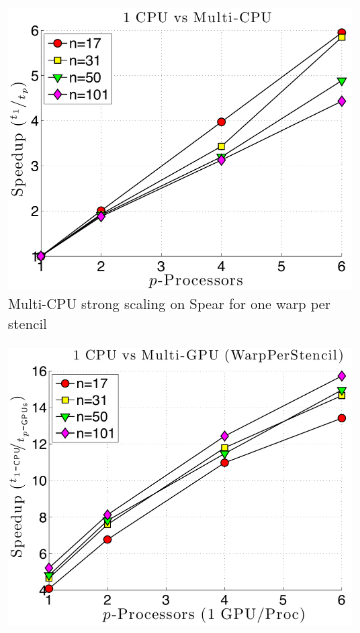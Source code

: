 \begin{figure}
\centering
\begin{subfigure}[t]{0.425\textwidth}
\centering
\includegraphics[width=1.0\textwidth]{../figures/spear_results/alltoallv_vortex/speedup_1CPU_vs_NCPU.pdf}
\caption{Multi-CPU strong scaling on Spear for one warp per stencil}
\label{fig:spear_alltoall_multicpu_scaling}
\end{subfigure} 
\begin{subfigure}[t]{0.425\textwidth}
\centering
\includegraphics[width=1.0\textwidth]{../figures/spear_results/alltoallv_vortex/speedup_1CPU_vs_NGPU_WarpPerStencil.pdf}

\end{subfigure}
\end{figure}
